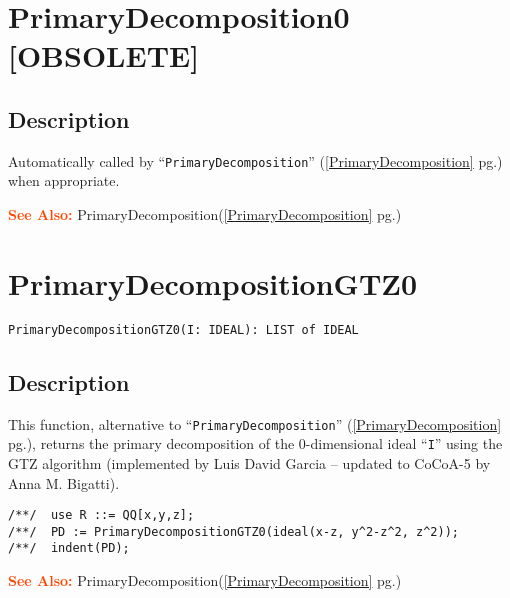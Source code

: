 \documentclass[a4paper]{mybook}
\newenvironment{command}{}{} %
\newcommand\SeeAlso{\par\textcolor{OrangeRed}{\textbf{\large See Also: }}}
\begin{document}
\section{PrimaryDecomposition0 [OBSOLETE]}
\label{PrimaryDecomposition0 [OBSOLETE]}
\begin{command} %



\subsection*{Description}

Automatically called by ``\verb&PrimaryDecomposition&'' (\ref{PrimaryDecomposition} pg.\pageref{PrimaryDecomposition}) when appropriate.

\SeeAlso %
  PrimaryDecomposition(\ref{PrimaryDecomposition} pg.\pageref{PrimaryDecomposition})
\end{command} %

\section{PrimaryDecompositionGTZ0}
\label{PrimaryDecompositionGTZ0}
\begin{command} %


\begin{Verbatim}[label=syntax, rulecolor=\color{MidnightBlue},
frame=single]
PrimaryDecompositionGTZ0(I: IDEAL): LIST of IDEAL
\end{Verbatim}


\subsection*{Description}

This function, alternative to ``\verb&PrimaryDecomposition&'' (\ref{PrimaryDecomposition} pg.\pageref{PrimaryDecomposition}),
returns the primary decomposition of the 0-dimensional
ideal ``\verb&I&'' using the GTZ algorithm (implemented by Luis David
Garcia -- updated to CoCoA-5 by Anna M. Bigatti).
\begin{Verbatim}[label=example, rulecolor=\color{PineGreen}, frame=single]
/**/  use R ::= QQ[x,y,z];
/**/  PD := PrimaryDecompositionGTZ0(ideal(x-z, y^2-z^2, z^2));
/**/  indent(PD);
\end{Verbatim}


\SeeAlso %
  PrimaryDecomposition(\ref{PrimaryDecomposition} pg.\pageref{PrimaryDecomposition})
\end{command} %
\end{document}
